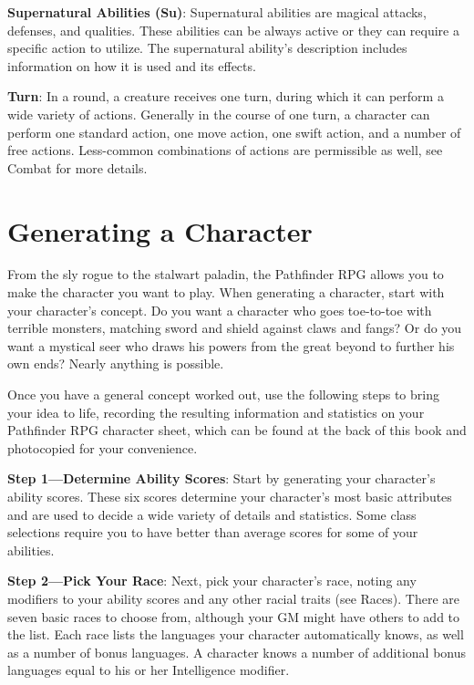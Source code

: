 \textbf{Supernatural Abilities (Su)}: Supernatural abilities are magical attacks, defenses, and qualities. These abilities can be always active or they can require a specific action to utilize. The supernatural ability's description includes information on how it is used and its effects.
				
\textbf{Turn}: In a round, a creature receives one turn, during which it can perform a wide variety of actions. Generally in the course of one turn, a character can perform one standard action, one move action, one swift action, and a number of free actions. Less-common combinations of actions are permissible as well, see Combat for more details.
				
\section{Generating a Character}

				
From the sly rogue to the stalwart paladin, the Pathfinder RPG allows you to make the character you want to play. When generating a character, start with your character's concept. Do you want a character who goes toe-to-toe with terrible monsters, matching sword and shield against claws and fangs? Or do you want a mystical seer who draws his powers from the great beyond to further his own ends? Nearly anything is possible. 
				
Once you have a general concept worked out, use the following steps to bring your idea to life, recording the resulting information and statistics on your Pathfinder RPG character sheet, which can be found at the back of this book and photocopied for your convenience. 
				
\textbf{Step 1---Determine Ability Scores}: Start by generating your character's ability scores. These six scores determine your character's most basic attributes and are used to decide a wide variety of details and statistics. Some class selections require you to have better than average scores for some of your abilities.
				
\textbf{Step 2---Pick Your Race}: Next, pick your character's race, noting any modifiers to your ability scores and any other racial traits (see Races). There are seven basic races to choose from, although your GM might have others to add to the list. Each race lists the languages your character automatically knows, as well as a number of bonus languages. A character knows a number of additional bonus languages equal to his or her Intelligence modifier.
				
